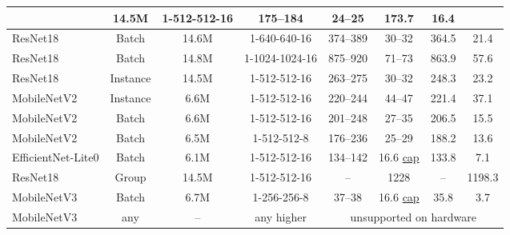 \begin{table}[ht]
\begin{tabularx}{\textwidth}{Xcc|c|cc|cc}
		& 14.5M
		& 1-512-512-16
		& 175--184
		& 24--25
		& 173.7
		& 16.4 \\
		\hline
		ResNet18
		& Batch
		& 14.6M
		& 1-640-640-16
		& 374--389
		& 30--32
		& 364.5
		& 21.4 \\
		\hline
		ResNet18
		& Batch
		& 14.8M
		& 1-1024-1024-16
		& 875--920
		& 71--73
		& 863.9
		& 57.6 \\
		\hline
		ResNet18
		& Instance
		& 14.5M
		& 1-512-512-16
		& 263--275
		& 30--32
		& 248.3
		& 23.2 \\
		\hline
		MobileNetV2
		& Instance
		& 6.6M
		& 1-512-512-16
		& 220--244
		& 44--47
		& 221.4
		& 37.1 \\
		\hline
		MobileNetV2
		& Batch
		& 6.6M
		& 1-512-512-16
		& 201--248
		& 27--35
		& 206.5
		& 15.5 \\
		\hline
		MobileNetV2
		& Batch
		& 6.5M
		& 1-512-512-8
		& 176--236
		& 25--29
		& 188.2
		& 13.6 \\
		\hline
		EfficientNet-Lite0
		& Batch
		& 6.1M
		& 1-512-512-16
		& 134--142
		& 16.6 \underline{cap}
		& 133.8
		& 7.1 \\
		\hline
		ResNet18
		& Group
		& 14.5M
		& 1-512-512-16
		& --
		& 1228
		& --
		& 1198.3 \\
		\hline
		MobileNetV3
		& Batch
		& 6.7M
		& 1-256-256-8 
		& 37--38
		& 16.6 \underline{cap} 
		& 35.8
		& 3.7 \\
		\hline
		MobileNetV3
		& any
		& --
		& any higher 
		& \multicolumn{4}{c}{unsupported on hardware}\\
%
	\end{tabularx}	
	\centering

\end{table}
